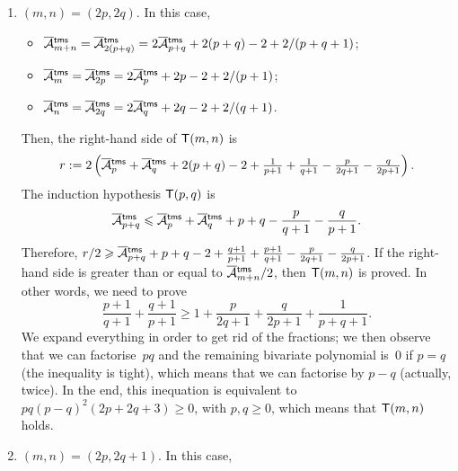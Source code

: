 \begin{enumerate}

  \item \((m,n) = (2p,2q)\). In this case,
    \begin{itemize}

      \item \(\OM{\fun{tms}}{m+n} = \OM{\fun{tms}}{2(p+q)} =
        2\OM{\fun{tms}}{p+q} + 2(p+q) - 2 + 2/(p+q+1)\);

      \item \(\OM{\fun{tms}}{m} = \OM{\fun{tms}}{2p} =
        2\OM{\fun{tms}}{p} + 2p - 2 + 2/(p+1)\);

      \item \(\OM{\fun{tms}}{n} = \OM{\fun{tms}}{2q} =
        2\OM{\fun{tms}}{q} + 2q - 2 + 2/(q+1)\).

    \end{itemize}
    Then, the right\hyp{}hand side of \(\textsf{T}({m,n})\) is
    \begin{equation*}
      r := 2\left(\OM{\fun{tms}}{p} + \OM{\fun{tms}}{q} + 2(p+q) - 2 +
        \tfrac{1}{p+1} + \tfrac{1}{q+1} - \tfrac{p}{2q+1} -
        \tfrac{q}{2p+1}\right).
    \end{equation*}
    The induction hypothesis \(\textsf{T}({p,q})\) is
    \begin{equation*}
      \OM{\fun{tms}}{p+q} \leqslant \OM{\fun{tms}}{p} +
      \OM{\fun{tms}}{q} + p + q - \frac{p}{q+1} - \frac{q}{p+1}.
    \end{equation*}
    Therefore, \(r/2 \geqslant \OM{\fun{tms}}{p+q} + p + q -
    2 + \tfrac{q+1}{p+1} + \tfrac{p+1}{q+1} - \tfrac{p}{2q+1} -
    \tfrac{q}{2p+1}\). If the right\hyp{}hand side is greater than or
    equal to \(\OM{\fun{tms}}{m+n}/2\), then
    \(\textsf{T}({m,n})\) is proved. In other words, we need to prove
    \begin{equation*}
      \frac{p+1}{q+1} + \frac{q+1}{p+1} \geqslant 1 +
      \frac{p}{2q+1} + \frac{q}{2p+1} + \frac{1}{p+q+1}.
    \end{equation*}
    We expand everything in order to get rid of the fractions; we then
    observe that we can factorise~\(pq\) and the remaining bivariate
    polynomial is~\(0\) if \(p=q\) (the inequality is tight), which
    means that we can factorise by \(p-q\) (actually, twice). In the
    end, this inequation is equivalent to \(pq(p-q)^2(2p+2q+3)
    \geqslant 0\), with \(p,q \geqslant 0\), which means that
    \(\textsf{T}({m,n})\) holds.

  \item \((m,n) = (2p,2q+1)\). In this case,
    \begin{itemize}


\end{itemize}
\end{enumerate}
